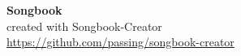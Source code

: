 \documentclass{scrartcl}
\begin{document}
\begin{titlepage}
\begin{center}
\vspace* {\fill}
{\Huge \textbf{Songbook}} \\
\vspace* {\fill}
created with Songbook-Creator \\
{\small{\href{https://github.com/passing/songbook-creator}{https://github.com/passing/songbook-creator}}}
\end{center}
\end{titlepage}

\setcounter{page}{1}



\printindex[interprets]
\printindex[titles]
\end{document}

